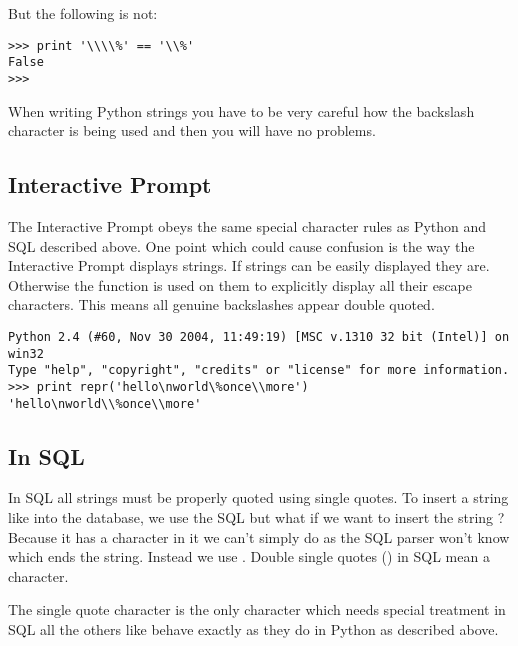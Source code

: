 \documentclass{howto}
\begin{document}
But the following is not:

\begin{verbatim}
>>> print '\\\\%' == '\\%'
False
>>>
\end{verbatim}

When writing Python strings you have to be very careful how the backslash character is being used and then you will have no problems.

\subsection{Interactive Prompt}

The Interactive Prompt obeys the same special character rules as Python and SQL described above. One point which could cause confusion is the way the Interactive Prompt displays strings. If strings can be easily displayed they are. Otherwise the  function is used on them to explicitly display all their escape characters. This means all genuine backslashes appear double quoted.

\begin{verbatim}
Python 2.4 (#60, Nov 30 2004, 11:49:19) [MSC v.1310 32 bit (Intel)] on win32
Type "help", "copyright", "credits" or "license" for more information.
>>> print repr('hello\nworld\%once\\more')
'hello\nworld\\%once\\more'
\end{verbatim}

\subsection{In SQL}

In SQL all strings must be properly quoted using single quotes. To insert a string like  into the database, we use the SQL  but what if we want to insert the string ? Because it has a  character in it we can't simply do  as the SQL parser won't know which  ends the string. Instead we use . Double single quotes () in SQL mean a  character. 

The single quote character  is the only character which needs special treatment in SQL all the others like  behave exactly as they do in Python as described above. 
\end{document}
